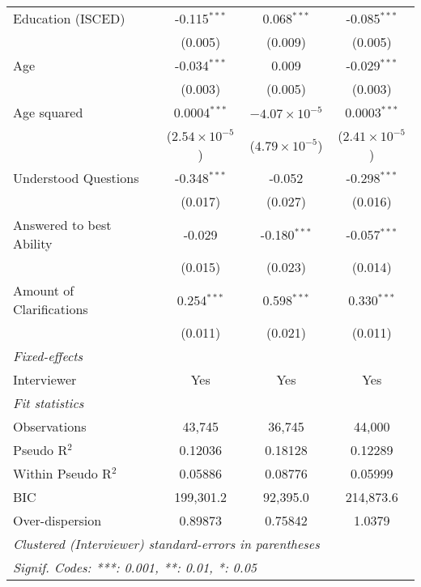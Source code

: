 \begin{table}[htbp]
\begin{tabular}{lccc}
      Education (ISCED)                     & -0.115$^{***}$          & 0.068$^{***}$           & -0.085$^{***}$\\   
                                            & (0.005)                 & (0.009)                 & (0.005)\\   
      Age                                   & -0.034$^{***}$          & 0.009                   & -0.029$^{***}$\\   
                                            & (0.003)                 & (0.005)                 & (0.003)\\   
      Age squared                           & 0.0004$^{***}$          & $-4.07\times 10^{-5}$   & 0.0003$^{***}$\\   
                                            & ($2.54\times 10^{-5}$)  & ($4.79\times 10^{-5}$)  & ($2.41\times 10^{-5}$)\\    
      Understood Questions                  & -0.348$^{***}$          & -0.052                  & -0.298$^{***}$\\   
                                            & (0.017)                 & (0.027)                 & (0.016)\\   
      Answered to best Ability              & -0.029                  & -0.180$^{***}$          & -0.057$^{***}$\\   
                                            & (0.015)                 & (0.023)                 & (0.014)\\   
      Amount of Clarifications              & 0.254$^{***}$           & 0.598$^{***}$           & 0.330$^{***}$\\   
                                            & (0.011)                 & (0.021)                 & (0.011)\\   
      \midrule
      \emph{Fixed-effects}\\
      Interviewer                           & Yes                     & Yes                     & Yes\\  
      \midrule
      \emph{Fit statistics}\\
      Observations                          & 43,745                  & 36,745                  & 44,000\\  
      Pseudo R$^2$                          & 0.12036                 & 0.18128                 & 0.12289\\  
      Within Pseudo R$^2$                   & 0.05886                 & 0.08776                 & 0.05999\\  
      BIC                                   & 199,301.2               & 92,395.0                & 214,873.6\\  
      Over-dispersion                       & 0.89873                 & 0.75842                 & 1.0379\\  
      \midrule \midrule
      \multicolumn{4}{l}{\emph{Clustered (Interviewer) standard-errors in parentheses}}\\
      \multicolumn{4}{l}{\emph{Signif. Codes: ***: 0.001, **: 0.01, *: 0.05}}\\
   \end{tabular}
\end{table}



